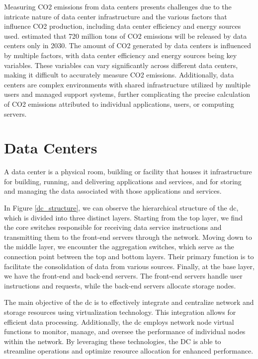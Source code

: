 \documentclass[
  a4paper,  %
  twoside,  %
  bibliography=totoc,
  headsepline,
  cleardoublepage=empty,
  parskip=half,
  draft=false
]{scrbook}
\begin{document}
Measuring CO2 emissions from data centers presents challenges due to the intricate nature of data center infrastructure and the various factors that influence CO2 production, including data center efficiency and energy sources used\cite{wang2013review}. \cite{review_data_center_2021} estimated that 720 million tons of CO2 emissions will be released by data centers only in 2030. The amount of CO2 generated by data centers is influenced by multiple factors, with data center efficiency and energy sources being key variables. These variables can vary significantly across different data centers, making it difficult to accurately measure CO2 emissions. Additionally, data centers are complex environments with shared infrastructure utilized by multiple users and managed support systems, further complicating the precise calculation of CO2 emissions attributed to individual applications, users, or computing servers.

\section{Data Centers}

A data center is a physical room, building or facility that houses \gls{it} infrastructure for building, running, and delivering applications and services, and for storing and managing the data associated with those applications and services\cite{ibmWhatData}.


In Figure \ref{dc_structure}, we can observe the hierarchical structure of the \gls{dc}, which is divided into three distinct layers. Starting from the top layer, we find the core switches responsible for receiving data service instructions and transmitting them to the front-end servers through the network. Moving down to the middle layer, we encounter the aggregation switches, which serve as the connection point between the top and bottom layers. Their primary function is to facilitate the consolidation of data from various sources. Finally, at the base layer, we have the front-end and back-end servers. The front-end servers handle user instructions and requests, while the back-end servers allocate storage nodes\cite{ZHU2023104322}. 


The main objective of the \gls{dc} is to effectively integrate and centralize network and storage resources using virtualization technology. This integration allows for efficient data processing. Additionally, the \gls{dc} employs network node virtual functions to monitor, manage, and oversee the performance of individual nodes within the network. By leveraging these technologies, the DC is able to streamline operations and optimize resource allocation for enhanced performance\cite{ZHU2023104322}.
\end{document}
